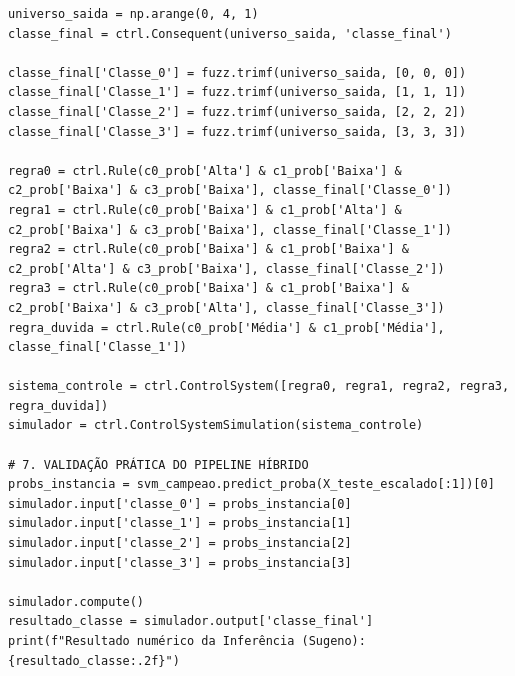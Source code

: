 \documentclass[journal]{IEEEtran}
\begin{document}
\begin{onecolumn}
\begin{verbatim}
universo_saida = np.arange(0, 4, 1)
classe_final = ctrl.Consequent(universo_saida, 'classe_final')

classe_final['Classe_0'] = fuzz.trimf(universo_saida, [0, 0, 0])
classe_final['Classe_1'] = fuzz.trimf(universo_saida, [1, 1, 1])
classe_final['Classe_2'] = fuzz.trimf(universo_saida, [2, 2, 2])
classe_final['Classe_3'] = fuzz.trimf(universo_saida, [3, 3, 3])

regra0 = ctrl.Rule(c0_prob['Alta'] & c1_prob['Baixa'] & c2_prob['Baixa'] & c3_prob['Baixa'], classe_final['Classe_0'])
regra1 = ctrl.Rule(c0_prob['Baixa'] & c1_prob['Alta'] & c2_prob['Baixa'] & c3_prob['Baixa'], classe_final['Classe_1'])
regra2 = ctrl.Rule(c0_prob['Baixa'] & c1_prob['Baixa'] & c2_prob['Alta'] & c3_prob['Baixa'], classe_final['Classe_2'])
regra3 = ctrl.Rule(c0_prob['Baixa'] & c1_prob['Baixa'] & c2_prob['Baixa'] & c3_prob['Alta'], classe_final['Classe_3'])
regra_duvida = ctrl.Rule(c0_prob['Média'] & c1_prob['Média'], classe_final['Classe_1'])

sistema_controle = ctrl.ControlSystem([regra0, regra1, regra2, regra3, regra_duvida])
simulador = ctrl.ControlSystemSimulation(sistema_controle)

# 7. VALIDAÇÃO PRÁTICA DO PIPELINE HÍBRIDO
probs_instancia = svm_campeao.predict_proba(X_teste_escalado[:1])[0]
simulador.input['classe_0'] = probs_instancia[0]
simulador.input['classe_1'] = probs_instancia[1]
simulador.input['classe_2'] = probs_instancia[2]
simulador.input['classe_3'] = probs_instancia[3]

simulador.compute()
resultado_classe = simulador.output['classe_final']
print(f"Resultado numérico da Inferência (Sugeno): {resultado_classe:.2f}")
\end{verbatim}

\end{onecolumn} %
\end{document}
